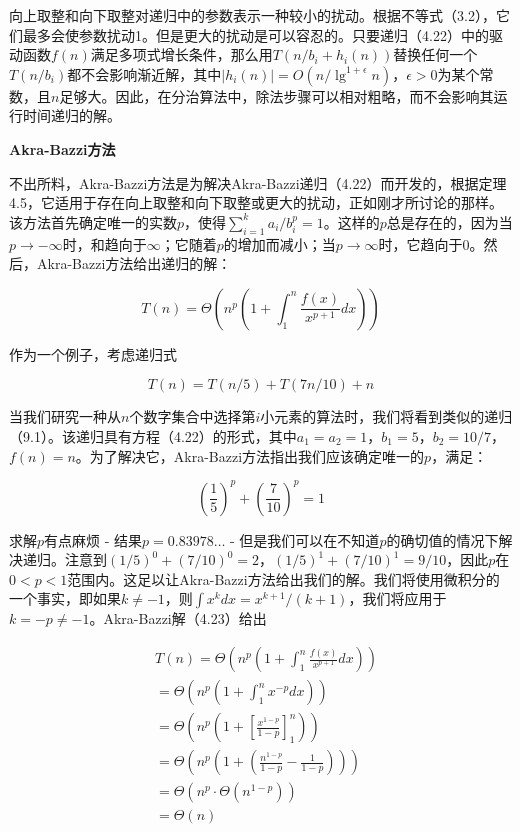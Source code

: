 \documentclass[lang=cn,newtx,10pt,scheme=chinese]{elegantbook}
\begin{document}
向上取整和向下取整对递归中的参数表示一种较小的扰动。根据不等式（3.2），它们最多会使参数扰动1。但是更大的扰动是可以容忍的。只要递归（4.22）中的驱动函数$f(n)$满足多项式增长条件，那么用$T\left(n / b_i+h_i(n)\right)$替换任何一个$T\left(n / b_i\right)$都不会影响渐近解，其中$\left|h_i(n)\right|=O\left(n / \lg ^{1+\epsilon} n\right)$，$\epsilon>0$为某个常数，且$n$足够大。因此，在分治算法中，除法步骤可以相对粗略，而不会影响其运行时间递归的解。

\textbf{Akra-Bazzi方法}

不出所料，Akra-Bazzi方法是为解决Akra-Bazzi递归（4.22）而开发的，根据定理4.5，它适用于存在向上取整和向下取整或更大的扰动，正如刚才所讨论的那样。该方法首先确定唯一的实数$p$，使得$\sum_{i=1}^k a_i / b_i^p=1$。这样的$p$总是存在的，因为当$p \rightarrow-\infty$时，和趋向于$\infty$；它随着$p$的增加而减小；当$p \rightarrow \infty$时，它趋向于0。然后，Akra-Bazzi方法给出递归的解：

\begin{equation}
T(n)=\Theta\left(n^p\left(1+\int_1^n \frac{f(x)}{x^{p+1}} d x\right)\right)
\end{equation}

作为一个例子，考虑递归式

\begin{equation}
T(n)=T(n / 5)+T(7 n / 10)+n
\end{equation}

当我们研究一种从$n$个数字集合中选择第$i$小元素的算法时，我们将看到类似的递归（9.1）。该递归具有方程（4.22）的形式，其中$a_1=a_2=1$，$b_1=5$，$b_2=10/7$，$f(n)=n$。为了解决它，Akra-Bazzi方法指出我们应该确定唯一的$p$，满足：

$$
\left(\frac{1}{5}\right)^p+\left(\frac{7}{10}\right)^p=1
$$

求解$p$有点麻烦 - 结果$p=0.83978 \ldots$ - 但是我们可以在不知道$p$的确切值的情况下解决递归。注意到$(1 / 5)^0+(7 / 10)^0=2$，$(1 / 5)^1+(7 / 10)^1=9 / 10$，因此$p$在$0<p<1$范围内。这足以让Akra-Bazzi方法给出我们的解。我们将使用微积分的一个事实，即如果$k \neq-1$，则$\int x^k d x=x^{k+1} /(k+1)$，我们将应用于$k=-p \neq-1$。Akra-Bazzi解（4.23）给出

$$
\begin{aligned}
& T(n)=\Theta\left(n^p\left(1+\int_1^n \frac{f(x)}{x^{p+1}} d x\right)\right) \\
& =\Theta\left(n^p\left(1+\int_1^n x^{-p} d x\right)\right) \\
& =\Theta\left(n^p\left(1+\left[\frac{x^{1-p}}{1-p}\right]_1^n\right)\right) \\
& =\Theta\left(n^p\left(1+\left(\frac{n^{1-p}}{1-p}-\frac{1}{1-p}\right)\right)\right) \\
& =\Theta\left(n^p \cdot \Theta\left(n^{1-p}\right)\right) \\
& =\Theta(n) \\
&
\end{aligned}
$$
\end{document}

